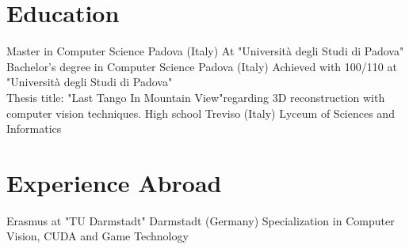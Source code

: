 \documentclass[letterpaper]{twentysecondcv} %
\begin{document}
\section{Education}

\begin{twenty} %
		{Master in Computer Science}	{Padova (Italy)}
		{At "Università degli Studi di Padova"\footnotemarkA[1]}
		{Bachelor's degree in Computer Science}	{Padova (Italy)}
		{Achieved with 100/110 at "Università degli Studi di Padova"\footnotemarkA[2]\\
		Thesis title: "Last Tango In Mountain View"\footnotemarkA[3] regarding 3D reconstruction with computer vision techniques.}
		{High school}	{Treviso (Italy)}
		{Lyceum of Sciences and Informatics}
\end{twenty}

\section{Experience Abroad}  

\begin{twenty}
	{Erasmus at "TU Darmstadt"\footnotemarkA[2]} {Darmstadt (Germany)}
	{Specialization in Computer Vision, CUDA and Game Technology}
\end{twenty}



\end{document}
